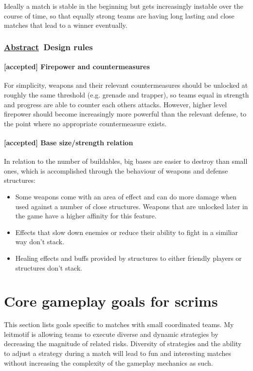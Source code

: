 \documentclass{scrartcl}
\newcommand{\abstrac}  [0]{\textbf{\underline{Abstract}\ }}
\newcommand{\accepted} [0]{\textcolor{completed}{\textbf{[accepted] }}}
\begin{document}
Ideally a match is stable in the beginning but gets increasingly instable over the course of time, so that equally strong teams are having long lasting and close matches that lead to a winner eventually.

\subsubsection{\abstrac Design rules}

\paragraph{\accepted Firepower and countermeasures}

For simplicity, weapons and their relevant countermeasures should be unlocked at roughly the same threshold (e.g. grenade and trapper), so teams equal in strength and progress are able to counter each others attacks. However, higher level firepower should become increasingly more powerful than the relevant defense, to the point where no appropriate countermeasure exists.

\paragraph{\accepted Base size/strength relation}

In relation to the number of buildables, big bases are easier to destroy than small ones, which is accomplished through the behaviour of weapons and defense structures:

\begin{itemize}
\item Some weapons come with an area of effect and can do more damage when used against a number of close structures. Weapons that are unlocked later in the game have a higher affinity for this feature.
\item Effects that slow down enemies or reduce their ability to fight in a similiar way don't stack.
\item Healing effects and buffs provided by structures to either friendly players or structures don't stack.
\end{itemize}

\section{Core gameplay goals for scrims}
\label{core-gameplay-goals-for-scrims}

This section lists goals specific to matches with small coordinated teams. My leitmotif is allowing teams to execute diverse and dynamic strategies by decreasing the magnitude of related risks. Diversity of strategies and the ability to adjust a strategy during a match will lead to fun and interesting matches without increasing the complexity of the gameplay mechanics as such.
\end{document}
